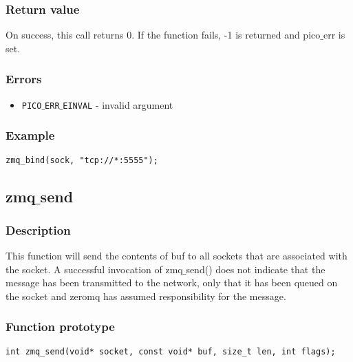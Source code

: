 \subsubsection*{Return value}
On success, this call returns 0. If the function fails, -1 is returned and pico$\_$err is set.

\subsubsection*{Errors}
\begin{itemize}[noitemsep]
\item \texttt{PICO$\_$ERR$\_$EINVAL} - invalid argument
\end{itemize}

\subsubsection*{Example}
\begin{verbatim}
zmq_bind(sock, "tcp://*:5555");
\end{verbatim}








\subsection{zmq$\_$send}

\subsubsection*{Description}
This function will send the contents of buf to all sockets that are associated with the socket.
A successful invocation of zmq$\_$send() does not indicate that the message has been transmitted to the network, only that it has been queued on the socket and zeromq has assumed responsibility for the message.

\subsubsection*{Function prototype}
\begin{verbatim}
int zmq_send(void* socket, const void* buf, size_t len, int flags);
\end{verbatim}

